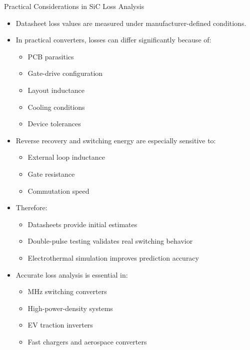 \begin{frame}{Practical Considerations in SiC Loss Analysis}
\begin{itemize}
    \item Datasheet loss values are measured under manufacturer-defined conditions.
    \item In practical converters, losses can differ significantly because of:
    \begin{itemize}
        \item PCB parasitics
        \item Gate-drive configuration
        \item Layout inductance
        \item Cooling conditions
        \item Device tolerances
    \end{itemize}

    \item Reverse recovery and switching energy are especially sensitive to:
    \begin{itemize}
        \item External loop inductance
        \item Gate resistance
        \item Commutation speed
    \end{itemize}

    \item Therefore:
    \begin{itemize}
        \item Datasheets provide initial estimates
        \item Double-pulse testing validates real switching behavior
        \item Electrothermal simulation improves prediction accuracy
    \end{itemize}

    \item Accurate loss analysis is essential in:
    \begin{itemize}
        \item MHz switching converters
        \item High-power-density systems
        \item EV traction inverters
        \item Fast chargers and aerospace converters
    \end{itemize}
\end{itemize}
\end{frame}


